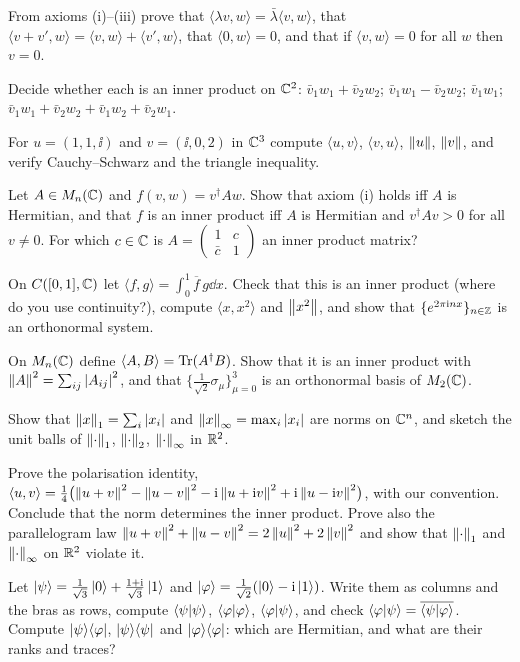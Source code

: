 \begin{exerciseset}
   From axioms (i)--(iii) prove that $\langle\lambda v,w\rangle=\bar\lambda\langle v,w\rangle$, that $\langle v+v',w\rangle=\langle v,w\rangle+\langle v',w\rangle$, that $\langle0,w\rangle=0$, and that if $\langle v,w\rangle=0$ for all $w$ then $v=0$.

   Decide whether each is an inner product on $\mathbb{C}^2$: $\bar v_1w_1+\bar v_2w_2$; $\bar v_1w_1-\bar v_2w_2$; $\bar v_1w_1$; $\bar v_1w_1+\bar v_2w_2+\bar v_1w_2+\bar v_2w_1$.

   For $u=(1,1,\ii)$ and $v=(\ii,0,2)$ in $\mathbb{C}^3$ compute $\langle u,v\rangle$, $\langle v,u\rangle$, $\left\|u\right\|$, $\left\|v\right\|$, and verify Cauchy--Schwarz and the triangle inequality.

   Let $A\in M_n(\mathbb{C})$ and $f(v,w)=v^\dagger Aw$. Show that axiom (i) holds iff $A$ is Hermitian, and that $f$ is an inner product iff $A$ is Hermitian and $v^\dagger Av>0$ for all $v\neq0$. For which $c\in\mathbb{C}$ is $A=\begin{pmatrix}1&c\\\bar c&1\end{pmatrix}$ an inner product matrix?

   On $C([0,1],\mathbb{C})$ let $\langle f,g\rangle=\int_0^1\overline f\,g\dd x$. Check that this is an inner product (where do you use continuity?), compute $\langle x,x^2\rangle$ and $\left\|x^2\right\|$, and show that $\{e^{2\pi\mathrm{i} nx}\}_{n\in\mathbb{Z}}$ is an orthonormal system.

   On $M_n(\mathbb{C})$ define $\langle A,B\rangle=\operatorname{Tr}(A^\dagger B)$. Show that it is an inner product with $\left\|A\right\|^2=\sum_{ij}\left|A_{ij}\right|^2$, and that $\{\tfrac1{\sqrt2}\sigma_\mu\}_{\mu=0}^3$ is an orthonormal basis of $M_2(\mathbb{C})$.

   Show that $\left\|x\right\|_1=\sum_i\left|x_i\right|$ and $\left\|x\right\|_\infty=\max_i\left|x_i\right|$ are norms on $\mathbb{C}^n$, and sketch the unit balls of $\left\|\cdot\right\|_1$, $\left\|\cdot\right\|_2$, $\left\|\cdot\right\|_\infty$ in $\mathbb{R}^2$.

   Prove the polarisation identity, $\langle u,v\rangle=\tfrac14\bigl(\left\|u+v\right\|^2-\left\|u-v\right\|^2-\mathrm{i}\left\|u+\mathrm{i} v\right\|^2+\mathrm{i}\left\|u-\mathrm{i} v\right\|^2\bigr)$, with our convention. Conclude that the norm determines the inner product. Prove also the parallelogram law $\left\|u+v\right\|^2+\left\|u-v\right\|^2=2\left\|u\right\|^2+2\left\|v\right\|^2$ and show that $\left\|\cdot\right\|_1$ and $\left\|\cdot\right\|_\infty$ on $\mathbb{R}^2$ violate it.

   Let $\left|\psi\right\rangle=\frac1{\sqrt3}\left|0\right\rangle+\frac{1+\mathrm{i}}{\sqrt3}\left|1\right\rangle$ and $\left|\varphi\right\rangle=\frac1{\sqrt2}(\left|0\right\rangle-\mathrm{i}\left|1\right\rangle)$. Write them as columns and the bras as rows, compute $\left\langle\psi\middle|\psi\right\rangle$, $\left\langle\varphi\middle|\varphi\right\rangle$, $\left\langle\varphi\middle|\psi\right\rangle$, and check $\left\langle\varphi\middle|\psi\right\rangle=\overline{\left\langle\psi\middle|\varphi\right\rangle}$. Compute $\left|\psi\right\rangle\!\left\langle\varphi\right|$, $\left|\psi\right\rangle\!\left\langle\psi\right|$ and $\left|\varphi\right\rangle\!\left\langle\varphi\right|$: which are Hermitian, and what are their ranks and traces?


\end{exerciseset}
